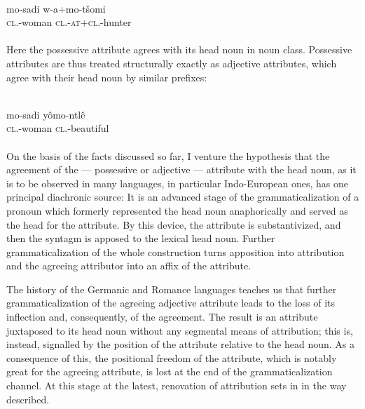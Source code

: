 \ea\label{ex:E44}
\\
\gll    mo-sadi  w-a+mo-tšomi\\
 \textsc{cl}.\glsg-woman  \textsc{cl}.\glsg-\textsc{at}+\textsc{cl}.\glsg-hunter\\
\\
\z
\noindent Here the possessive attribute agrees with its head noun in noun class. Possessive attributes are thus treated structurally exactly as adjective attributes, which agree with their head noun by similar prefixes:

\ea\label{ex:E45}
\\
\gll     mo-sadi  yômo-ntlê\\
 \textsc{cl}.\glsg-woman  \textsc{cl}.\glsg-beautiful\\
\\
\z
\noindent \label{page77}On the basis of the facts discussed so far, I venture the hypothesis that the agreement of the — possessive or adjective — attribute with the head noun, as it is to be observed in many languages, in particular Indo-European ones, has one principal diachronic source: It is an advanced stage of the grammaticalization of a pronoun which formerly represented the head noun anaphorically and served as the head for the attribute. By this device, the attribute is substantivized, and then the syntagm is apposed to the lexical head noun. Further grammaticalization of the whole construction turns apposition into attribution and the agreeing attributor into an affix of the attribute.

The history of the Germanic and Romance languages teaches us that further grammaticalization of the agreeing adjective attribute leads to the loss of its inflection and, consequently, of the agreement. The result is an attribute juxtaposed to its head noun without any segmental means of attribution; this is, instead, signalled by the position of the attribute relative to the head noun. As a consequence of this, the positional freedom of the attribute, which is notably great for the agreeing attribute, is lost at the end of the grammaticalization channel. At this stage at the latest, renovation of attribution sets in in the way described.

